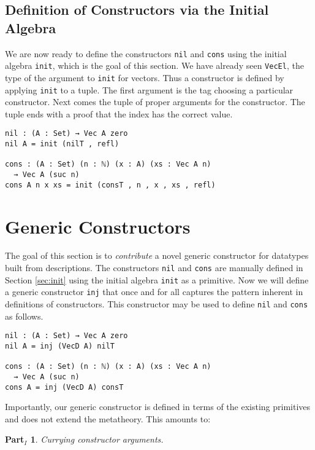 \documentclass[nonatbib]{sigplanconf}
\newtheorem{myparti}{Part$_I$}
\newcommand{\refsec}[1]{Section \ref{sec:#1}}
\begin{document}
\subsection{Definition of Constructors via the Initial Algebra}
\label{sec:init:cons}

We are now ready to define the constructors {\tt nil} and
{\tt cons} using the initial algebra {\tt init}, which is the goal of
this section.
We have already seen
{\tt VecEl}, the type of the argument to {\tt init} for vectors.
Thus a constructor is defined by applying {\tt init} to a tuple. The
first argument is the tag choosing a particular constructor. Next comes
the tuple of proper arguments for the constructor. The tuple
ends with a proof that the index has the correct value.

\begin{verbatim}
nil : (A : Set) → Vec A zero
nil A = init (nilT , refl)

cons : (A : Set) (n : ℕ) (x : A) (xs : Vec A n)
  → Vec A (suc n)
cons A n x xs = init (consT , n , x , xs , refl)
\end{verbatim}

\section{Generic Constructors}
\label{sec:inj}

The goal of this section is to {\it contribute} a novel generic
constructor for datatypes built from descriptions.
The constructors {\tt nil} and {\tt cons} are manually
defined in \refsec{init} using the initial algebra
{\tt init} as a primitive. Now we will define a generic constructor
{\tt inj} that once and for all captures the pattern inherent in
definitions of constructors.  This constructor
may be used to define {\tt nil} and {\tt cons} as follows.

\begin{verbatim}
nil : (A : Set) → Vec A zero
nil A = inj (VecD A) nilT

cons : (A : Set) (n : ℕ) (x : A) (xs : Vec A n)
  → Vec A (suc n)
cons A = inj (VecD A) consT
\end{verbatim}

Importantly, our generic constructor is
defined in terms of the existing primitives and does not extend the
metatheory.
This amounts to:

\begin{myparti}
\label{parti:one}
Currying constructor arguments.
\end{myparti}
\end{document}
